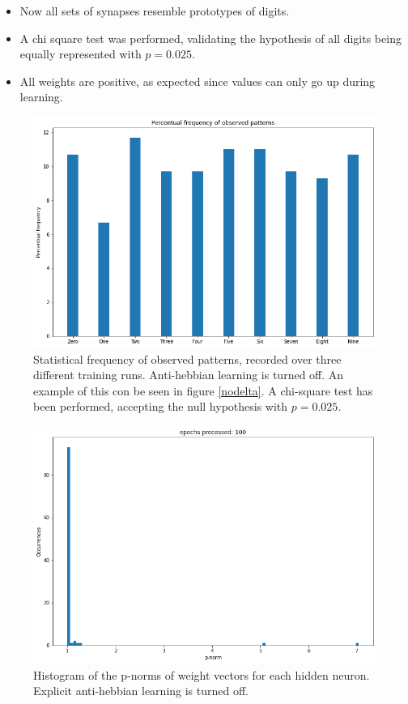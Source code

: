 \documentclass[a4paper]{report}
\begin{document}
\begin{itemize}
    \item Now all sets of synapses resemble prototypes of digits.
    \item A chi square test was performed, validating the hypothesis of all digits being equally represented with $p  = 0.025$.
    \item All weights are positive, as expected since values can only go up during learning.
\end{itemize}

\begin{figure} [H]
    \centering
    \includegraphics [width=12cm ] {o/bar1.png}
    \caption{Statistical frequency of observed patterns, recorded over three different training runs. Anti-hebbian learning is turned off. An example of this con be seen in figure \ref{nodelta}. A chi-square test has been performed, accepting the null hypothesis with $p  = 0.025$.}
    \label{o/cerchio2}
\end{figure}
\begin{figure} [H]
\centering
\includegraphics [width=12cm ] {o/ii_hist.png}
\caption{Histogram of the p-norms of weight vectors for each hidden neuron. Explicit anti-hebbian learning is turned off.}
\label{ii_hist}
\end{figure}
\end{document}
